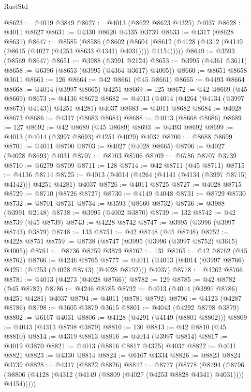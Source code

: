 \begin{lexlean}{RustStd}
\begin{coremodule}
@8623 := @4019 @3849
@8627 := @4013 (@8622 @8623 @4325) @4037
@8628 := @4011 @8627
@8631 := @4330 @8620 @4335 @3739
@8633 := @4317 (@8628 @8631)
@8647 := @8585
    (@8586
      (@8602
        (@8604 (@8612 (@4128 (@4312 (@4149 (@8615 (@4027 (@4253 @8633 @4341) @4031)))) @4154)))))
@8649 := @3593 (@8569 @8647)
@8651 := @3988 (@3991 @2124)
@8653 := @3995 (@4361 @3611)
@8658 := @6396 (@8653 (@3995 (@4364 @3617) @4005))
@8660 := @8651 @8658 @3611
@8661 := 126
@8664 := @42 @8661 (@45 @8661)
@8665 := @4493 @8664
@8668 := @4014 (@3997 @8665) @4251
@8669 := 125
@8672 := @42 @8669 (@45 @8669)
@8673 := @4136 @8672
@8682 := @4013 (@4014 (@4264 (@4134 (@3997 @8673) @4143)) @4251 @4281) @4037
@8683 := @4011 @8682
@8684 := @4028 @8673
@8686 := @4317 (@8683 @8684)
@8688 := @4013 (@8668 @8686)
@8689 := 127
@8692 := @42 @8689 (@45 @8689)
@8693 := @4493 @8692
@8699 := @4013 (@4014 (@3997 @8693) @4251 @4029) @4037
@8700 := @8688 @8699
@8701 := @4011 @8700
@8703 := @4027 (@4028 @8665)
@8706 := @4027 (@4028 @8693) @4031
@8707 := @8703 @8706
@8709 := @6786 @8707 @3739
@8710 := @6279 @8709
@8711 := 128
@8714 := @42 @8711 (@45 @8711)
@8715 := @4136 @8714
@8725 := @4013 (@4014 (@4264 (@4141 (@4134 (@3997 @8715) @4142))) @4251 @4281) @4037
@8726 := @4011 @8725
@8727 := @4028 @8715
@8729 := @8710 (@8726 @8727)
@8730 := @4149 @4048
@8731 := @8729 @8730
@8732 := @8701 @8731
@8734 := @3593 (@8660 @8732)
@8736 := @3988 (@3991 @2148)
@8738 := @3995 (@4002 @3870)
@8739 := 132
@8742 := @42 @8739 (@45 @8739)
@8743 := @4228 @8742
@8747 := @3995 (@3996 (@3997 @8743) @3879)
@8748 := 133
@8751 := @42 @8748 (@45 @8748)
@8752 := @4228 @8751
@8759 := @8738 (@8747 (@3995 (@3996 (@3997 @8752) @3615) @4005))
@8761 := @8736 @8759 @3879
@8762 := 131
@8765 := @42 @8762 (@45 @8762)
@8766 := @4246 @8765
@8777 := @4011 (@4013 (@4014 (@3997 @8766) @4251 (@4253 (@4028 @8743) (@4028 @8752))) @4037)
@8778 := @4262 @8766
@8781 := @4013 (@4273 (@4028 @8766))
@8782 := 129
@8785 := @42 @8782 (@45 @8782)
@8786 := @4246 @8785
@8792 := @4013 (@4014 (@3997 @8786) @4251 @4281) @4037
@8794 := @4011 (@8781 @8792)
@8796 := @4123 (@4287 @8786)
@8798 := @3605 @3879 @3615
@8801 := @4043 (@4292 @8798 @3879)
@8802 := @6167 @4031
@8806 := @4128 (@4291 (@4149 (@8801 @8802)))
@8809 := @4043 (@4313 @8798 @3879)
@8810 := 130
@8813 := @42 @8810 (@45 @8810)
@8814 := @4319 @8813
@8816 := @4014 (@3997 @8814)
@8817 := @4019 @3870
@8821 := @4013 (@8816 @8817 @4325) @4037
@8822 := @4011 @8821
@8823 := @4330 @8814
@8824 := @6167 @4334
@8826 := @8823 @8824 @3739
@8828 := @4317 (@8822 @8826)
@8842 := @8777
    (@8778
      (@8794
        (@8796 (@8806 (@4128 (@4312 (@4149 (@8809 (@4027 (@4253 @8828 @4341) @4031)))) @4154)))))

\end{coremodule}
\end{lexlean}

